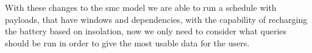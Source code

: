 With these changes to the \gls{smc} model we are able to run a schedule with payloads, that have windows and dependencies, with the capability of recharging the battery based on insolation, now we only need to consider what queries should be run in order to give the most usable data for the users.






